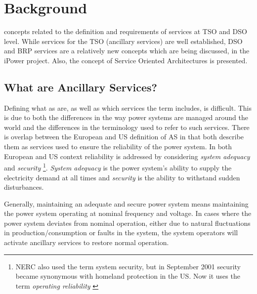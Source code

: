 
\section{Background}\label{sec:backgroundservicesandreq} %
 concepts related to the definition and requirements of services at TSO and DSO level. While services for the TSO (ancillary services) are well established, DSO and BRP services are a relatively new concepts which are being discussed, \eg in the iPower project. Also, the concept of Service Oriented Architectures is presented.
\subsection{What are Ancillary Services?} %
\label{sub:ancillaryservicesdef}
Defining what \gls{as} are, as well as which services the term includes, is difficult. This is due to both the differences in the way power systems are managed around the world and the differences in the terminology used to refer to such services. There is overlap between the European and US definition of AS in that both describe them as services used to ensure the reliability of the power system. In both European and US context reliability is addressed by considering \emph{system adequacy} and \emph{security} \footnote{NERC also used the term system security, but in September 2001 security became synonymous with homeland protection in the US. Now it uses the term \emph{operating reliability} \cite{nerc2007definition}}. \emph{System adequacy} is the power system's ability to supply the electricity demand at all times and \emph{security} is the ability to withstand sudden disturbances.

Generally, maintaining an adequate and secure power system means maintaining the power system operating at nominal frequency and voltage. In cases where the power system deviates from nominal operation, either due to natural fluctuations in production/consumption or faults in the system, the system operators will activate ancillary services to restore normal operation. 


